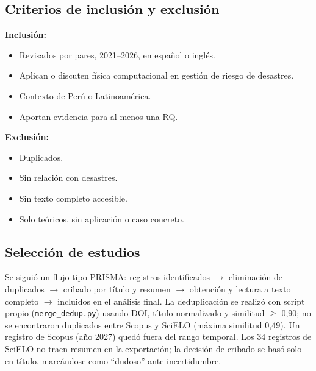 \documentclass[12pt,a4paper]{article}
\begin{document}
\subsection{Criterios de inclusión y exclusión}
\textbf{Inclusión:}
\begin{itemize}
  \item Revisados por pares, 2021--2026, en español o inglés.
  \item Aplican o discuten física computacional en gestión de riesgo de desastres.
  \item Contexto de Perú o Latinoamérica.
  \item Aportan evidencia para al menos una RQ.
\end{itemize}
\textbf{Exclusión:}
\begin{itemize}
  \item Duplicados.
  \item Sin relación con desastres.
  \item Sin texto completo accesible.
  \item Solo teóricos, sin aplicación o caso concreto.
\end{itemize}

\subsection{Selección de estudios}
Se siguió un flujo tipo PRISMA: registros identificados $\rightarrow$ eliminación de duplicados $\rightarrow$ cribado por título y resumen $\rightarrow$ obtención y lectura a texto completo $\rightarrow$ incluidos en el análisis final. La deduplicación se realizó con script propio (\texttt{merge\_dedup.py}) usando DOI, título normalizado y similitud $\ge$ 0,90; no se encontraron duplicados entre Scopus y SciELO (máxima similitud 0,49). Un registro de Scopus (año 2027) quedó fuera del rango temporal. Los 34 registros de SciELO no traen resumen en la exportación; la decisión de cribado se basó solo en título, marcándose como ``dudoso'' ante incertidumbre.
\end{document}

